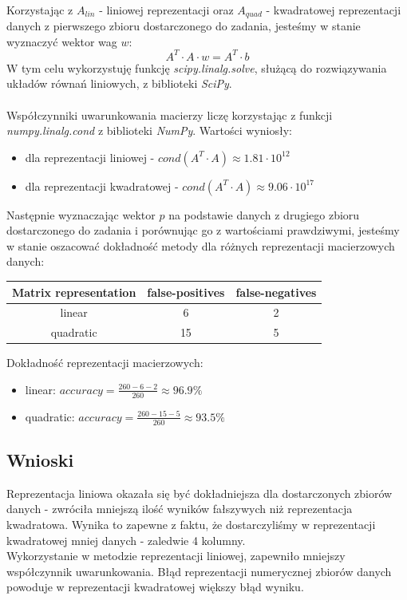 \documentclass{article}
\begin{document}
\\
Korzystając z $A_{lin}$ - liniowej reprezentacji oraz $A_{quad}$ - 
kwadratowej reprezentacji danych z pierwszego zbioru dostarczonego do zadania, jesteśmy w 
stanie wyznaczyć wektor wag $w$:
$$ A^T \cdot A \cdot w = A^T \cdot b$$
W tym celu wykorzystuję funkcję \textit{scipy.linalg.solve}, służącą do rozwiązywania 
układów równań liniowych, z biblioteki \textit{SciPy}. \\\\
Współczynniki uwarunkowania macierzy liczę korzystając z funkcji \textit{numpy.linalg.cond} 
z biblioteki \textit{NumPy}.
Wartości wyniosły:
\begin{itemize}
  \item dla reprezentacji liniowej - $cond(A^T\cdot A)\approx 1.81\cdot 10^{12}$
  \item dla reprezentacji kwadratowej - $cond(A^T\cdot A)\approx 9.06\cdot 10^{17}$
\end{itemize}
Następnie wyznaczając wektor $p$ na podstawie danych z drugiego zbioru dostarczonego do
zadania i porównując go z wartościami prawdziwymi, jesteśmy w stanie oszacować dokładność
metody dla różnych reprezentacji macierzowych danych:
\begin{center}
  \begin{tabular}{  |c|c|c| } 
   \hline
   Matrix representation & false-positives & false-negatives\\
   \hline
   linear & 6 & 2\\
   \hline
   quadratic & 15 & 5\\
   \hline
  \end{tabular}
\end{center}
Dokładność reprezentacji macierzowych:
\begin{itemize}
  \item linear: $accuracy = \frac{260-6-2}{260} \approx 96.9 \%$
  \item quadratic: $accuracy = \frac{260-15-5}{260} \approx 93.5 \%$
\end{itemize}
  \subsection*{Wnioski}
\null\quad Reprezentacja liniowa okazała się być dokładniejsza dla dostarczonych
zbiorów danych - zwróciła mniejszą
ilość wyników fałszywych niż reprezentacja kwadratowa. Wynika to zapewne
z faktu, że dostarczyliśmy w reprezentacji kwadratowej mniej danych - 
zaledwie 4 kolumny. \\
Wykorzystanie w metodzie reprezentacji liniowej, zapewniło 
mniejszy współczynnik uwarunkowania. Błąd reprezentacji 
numerycznej zbiorów danych powoduje w reprezentacji kwadratowej
większy błąd wyniku.
\end{document}
